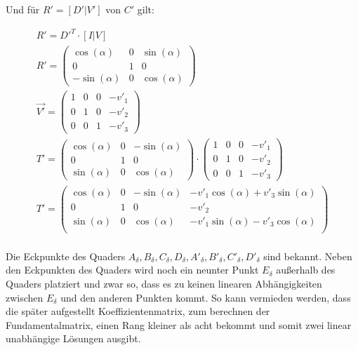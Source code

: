 Und für $R'=[D'|V']$ von $C'$ gilt:

\begin{gather}		
		R'=D'^T\cdot [I|V]\\
	R'= 
	\begin{pmatrix}
		\cos(\alpha)&0&\sin(\alpha)\\
		0&1&0\\
		-\sin(\alpha)&0&\cos(\alpha)
	\end{pmatrix}\\
	\vec{V'}= 
	\begin{pmatrix}
		1&0&0&-v'_1\\
		0&1&0&-v'_2\\
		0&0&1&-v'_3			
	\end{pmatrix}\\
	T'=		\begin{pmatrix}
		\cos(\alpha)&0&-\sin(\alpha)\\
		0&1&0\\
		\sin(\alpha)&0&\cos(\alpha)
	\end{pmatrix} 
	\cdot
	\begin{pmatrix}
		1&0&0&-v'_1\\
		0&1&0&-v'_2\\
		0&0&1&-v'_3			
	\end{pmatrix}\\
	T'=
	\begin{pmatrix}
		\cos(\alpha)&0&-\sin(\alpha)&-v'_1\cos(\alpha)+v'_3\sin(\alpha)\\
		0&1&0&-v'_2\\
		\sin(\alpha)&0&\cos(\alpha)&-v'_1\sin(\alpha)-v'_3\cos(\alpha)\\
	\end{pmatrix}
\end{gather}\\


Die Eckpunkte des Quaders $A_\delta,B_\delta,C_\delta,D_\delta,A'_\delta,B'_\delta,C'_\delta,D'_\delta$ sind bekannt. Neben den Eckpunkten des Quaders wird noch ein neunter Punkt $E_\delta$ außerhalb des Quaders platziert und zwar so, dass es zu keinen linearen Abhängigkeiten zwischen $E_\delta$ und den anderen Punkten kommt. So kann vermieden werden, dass die später aufgestellt Koeffizientenmatrix, zum berechnen der Fundamentalmatrix, einen Rang kleiner als acht bekommt und somit zwei linear unabhängige Lösungen ausgibt\cite{HZ}. 

